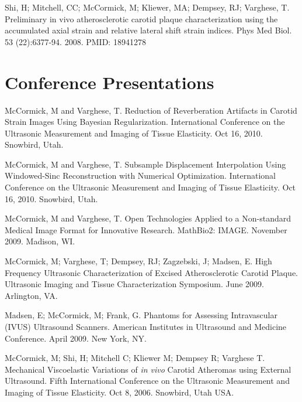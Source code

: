 \documentclass[margin,line]{res}
\begin{document}
\begin{resume}
Shi, H; Mitchell, CC; McCormick, M; Kliewer, MA; Dempsey, RJ; Varghese, T.
Preliminary in vivo atherosclerotic carotid plaque characterization
using the accumulated axial strain and relative lateral shift strain
indices.  Phys Med Biol. 53 (22):6377-94. 2008. PMID:
18941278

\section{\sc Conference Presentations}

McCormick, M and Varghese, T.  Reduction of Reverberation Artifacts in Carotid
Strain Images Using Bayesian Regularization.  International Conference on the
Ultrasonic Measurement and Imaging of Tissue Elasticity.  Oct 16, 2010.
Snowbird, Utah.

McCormick, M and Varghese, T.  Subsample Displacement Interpolation Using
Windowed-Sinc Reconstruction with Numerical Optimization.  International
Conference on the Ultrasonic Measurement and Imaging of Tissue Elasticity.  Oct
16, 2010.  Snowbird, Utah.

McCormick, M and Varghese, T.  Open Technologies Applied to a Non-standard Medical
Image Format for Innovative Research.  MathBio2: IMAGE.  November 2009.  Madison, WI.

McCormick, M; Varghese, T; Dempsey, RJ; Zagzebski, J; Madsen, E.  High Frequency Ultrasonic Characterization of Excised Atherosclerotic
Carotid Plaque.  Ultrasonic Imaging and Tissue Characterization
Symposium.  June 2009.  Arlington, VA.

Madsen, E;  McCormick, M;  Frank, G.  Phantoms for Assessing
Intravascular (IVUS) Ultrasound Scanners.  American Institutes in
Ultrasound and Medicine Conference.  April 2009.  New York, NY.

McCormick, M; Shi, H; Mitchell C; Kliewer M; Dempsey R; Varghese T.   Mechanical
Viscoelastic Variations of \textit{in vivo} Carotid Atheromas using External
Ultrasound.  Fifth International Conference on the Ultrasonic Measurement and
Imaging of Tissue Elasticity.  Oct 8, 2006.  Snowbird, Utah USA.



% 
% 
% 
% 


\end{resume}
\end{document}
